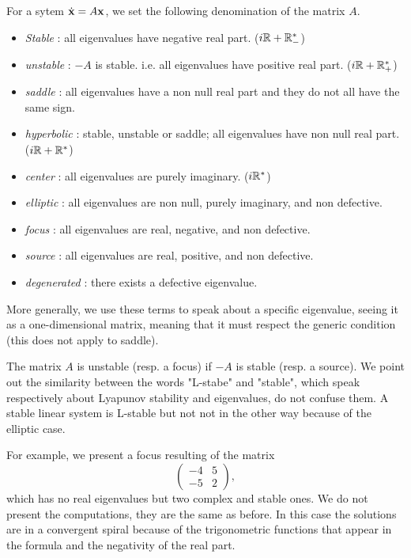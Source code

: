 \begin{definition}
    For a sytem $\dot{\mathbf{x}}=A\mathbf{x}$, we set the following denomination of the matrix $A$.
    \begin{itemize}
    \item \emph{Stable} : all eigenvalues have negative real part. ($i\mathbb{R}+\mathbb{R}^*_-$)
    \item \emph{unstable} : $-A$ is stable. i.e. all eigenvalues have positive real part. ($i\mathbb{R}+\mathbb{R}^*_+$)
    \item \emph{saddle} : all eigenvalues have a non null real part and they do not all have the same sign.
    \item \emph{hyperbolic} : stable, unstable or saddle; \ie all eigenvalues have non null real part. ($i\mathbb{R}+\mathbb{R}^*$)
    \item \emph{center} : all eigenvalues are purely imaginary. ($i\mathbb{R}^*$)
    \item \emph{elliptic} : all eigenvalues are non null, purely imaginary, and non defective.
    \item \emph{focus} : all eigenvalues are real, negative, and non defective.
    \item \emph{source} : all eigenvalues are real, positive, and non defective.
    \item \emph{degenerated} : there exists a defective eigenvalue.
    \end{itemize}
    More generally, we use these terms to speak about a specific eigenvalue, seeing it as a one-dimensional matrix, meaning that it must respect the generic condition (this does not apply to saddle).
\end{definition}
\begin{remarque}
    The matrix $A$ is unstable (resp. a focus) if $-A$ is stable (resp. a source).
    We point out the similarity between the words "L-stabe" and "stable", which speak respectively about Lyapunov stability and eigenvalues, do not confuse them. A stable linear system is L-stable but not not in the other way because of the elliptic case.
\end{remarque}
For example, we present a focus resulting of the matrix 
$$\begin{pmatrix}
-4 & 5 \\ -5 & 2
\end{pmatrix},$$
which has no real eigenvalues but two complex and stable ones. We do not present the computations, they are the same as before. In this case the solutions are in a convergent spiral because of the trigonometric functions that appear in the formula and the negativity of the real part.
